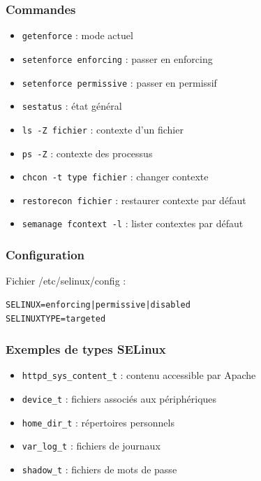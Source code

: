\documentclass[12pt,a4paper]{article}
\begin{document}
\subsubsection{Commandes}
\begin{itemize}
    \item \texttt{getenforce} : mode actuel
    \item \texttt{setenforce enforcing} : passer en enforcing
    \item \texttt{setenforce permissive} : passer en permissif
    \item \texttt{sestatus} : \'etat g\'en\'eral
    \item \texttt{ls -Z fichier} : contexte d'un fichier
    \item \texttt{ps -Z} : contexte des processus
    \item \texttt{chcon -t type fichier} : changer contexte
    \item \texttt{restorecon fichier} : restaurer contexte par d\'efaut
    \item \texttt{semanage fcontext -l} : lister contextes par d\'efaut
\end{itemize}

\subsubsection{Configuration}
Fichier /etc/selinux/config :
\begin{verbatim}
SELINUX=enforcing|permissive|disabled
SELINUXTYPE=targeted
\end{verbatim}

\subsubsection{Exemples de types SELinux}
\begin{itemize}
    \item \texttt{httpd\_sys\_content\_t} : contenu accessible par Apache
    \item \texttt{device\_t} : fichiers associ\'es aux p\'eriph\'eriques
    \item \texttt{home\_dir\_t} : r\'epertoires personnels
    \item \texttt{var\_log\_t} : fichiers de journaux
    \item \texttt{shadow\_t} : fichiers de mots de passe
\end{itemize}

\end{document}
